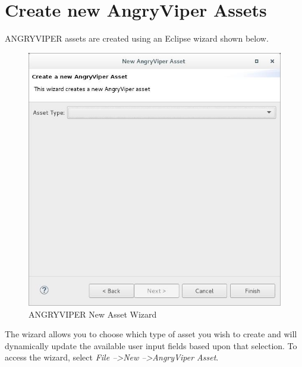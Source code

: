 \section{Create new AngryViper Assets}
\label{sec:create_assets}
\begin{flushleft}

ANGRYVIPER assets are created using an Eclipse wizard shown below. \newline
\begin{figure}[h!]
  \centering
  \includegraphics[scale=0.5]{figures/assetwizard.jpg}
  \caption{ANGRYVIPER New Asset Wizard}
  \label{fig:figure1}
\end{figure}

The wizard allows you to choose which type of asset you wish to create and will dynamically update the available user input fields based upon that selection.  To access the wizard, select \textit{File --\textgreater New --\textgreater AngryViper Asset}.

\end{flushleft}

\newpage

